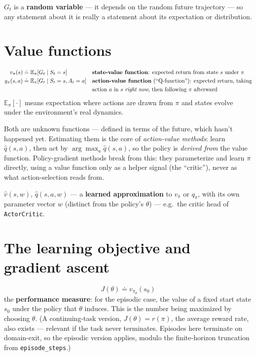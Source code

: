 \documentclass[11pt]{article}
\begin{document}
$G_t$ is a \textbf{random variable} --- it depends on the random future trajectory --- so
any statement about it is really a statement about its expectation or distribution.

\section*{Value functions}

\begin{align*}
v_\pi(s) &\doteq \mathbb E_\pi[G_t \mid S_t = s] &&\text{\textbf{state-value function}: expected return from state $s$ under $\pi$}\\
q_\pi(s,a) &\doteq \mathbb E_\pi[G_t \mid S_t = s, A_t = a] &&\text{\textbf{action-value function} (``Q-function''): expected return, taking}\\
&&&\text{action $a$ in $s$ \emph{right now}, then following $\pi$ afterward}
\end{align*}
$\mathbb E_\pi[\cdot]$ means expectation where actions are drawn from $\pi$ and states
evolve under the environment's real dynamics.

Both are unknown functions --- defined in terms of the future, which hasn't happened yet.
Estimating them is the core of \emph{action-value methods}: learn $\hat q(s,a)$, then act
by $\arg\max_a \hat q(s,a)$, so the policy is \emph{derived from} the value function.
Policy-gradient methods break from this: they parameterize and learn $\pi$ directly, using
a value function only as a helper signal (the ``critic''), never as what action-selection
reads from.

$\hat v(s,w)$, $\hat q(s,a,w)$ --- a \textbf{learned approximation} to $v_\pi$ or $q_\pi$,
with its own parameter vector $w$ (distinct from the policy's $\theta$) --- e.g.\ the critic
head of \texttt{ActorCritic}.

\section*{The learning objective and gradient ascent}

$$J(\theta) \doteq v_{\pi_\theta}(s_0)$$
the \textbf{performance measure}: for the episodic case, the value of a fixed start state
$s_0$ under the policy that $\theta$ induces. This is the number being maximized by
choosing $\theta$. (A continuing-task version, $J(\theta) = r(\pi)$, the average reward
rate, also exists --- relevant if the task never terminates. Episodes here terminate on
domain-exit, so the episodic version applies, modulo the finite-horizon truncation from
\texttt{episode\_steps}.)
\end{document}

